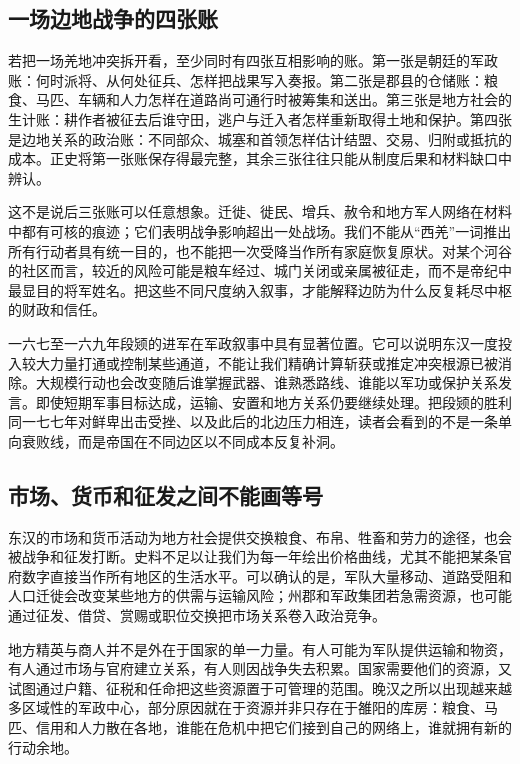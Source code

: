 \subsection{一场边地战争的四张账}

若把一场羌地冲突拆开看，至少同时有四张互相影响的账。第一张是朝廷的军政账：何时派将、从何处征兵、怎样把战果写入奏报。第二张是郡县的仓储账：粮食、马匹、车辆和人力怎样在道路尚可通行时被筹集和送出。第三张是地方社会的生计账：耕作者被征去后谁守田，逃户与迁入者怎样重新取得土地和保护。第四张是边地关系的政治账：不同部众、城塞和首领怎样估计结盟、交易、归附或抵抗的成本。正史将第一张账保存得最完整，其余三张往往只能从制度后果和材料缺口中辨认。

这不是说后三张账可以任意想象。迁徙、徙民、增兵、赦令和地方军人网络在材料中都有可核的痕迹；它们表明战争影响超出一处战场。我们不能从“西羌”一词推出所有行动者具有统一目的，也不能把一次受降当作所有家庭恢复原状。对某个河谷的社区而言，较近的风险可能是粮车经过、城门关闭或亲属被征走，而不是帝纪中最显目的将军姓名。把这些不同尺度纳入叙事，才能解释边防为什么反复耗尽中枢的财政和信任。

一六七至一六九年段颎的进军在军政叙事中具有显著位置。它可以说明东汉一度投入较大力量打通或控制某些通道，不能让我们精确计算斩获或推定冲突根源已被消除。大规模行动也会改变随后谁掌握武器、谁熟悉路线、谁能以军功或保护关系发言。即使短期军事目标达成，运输、安置和地方关系仍要继续处理。把段颎的胜利同一七七年对鲜卑出击受挫、以及此后的北边压力相连，读者会看到的不是一条单向衰败线，而是帝国在不同边区以不同成本反复补洞。

\subsection{市场、货币和征发之间不能画等号}

东汉的市场和货币活动为地方社会提供交换粮食、布帛、牲畜和劳力的途径，也会被战争和征发打断。史料不足以让我们为每一年绘出价格曲线，尤其不能把某条官府数字直接当作所有地区的生活水平。可以确认的是，军队大量移动、道路受阻和人口迁徙会改变某些地方的供需与运输风险；州郡和军政集团若急需资源，也可能通过征发、借贷、赏赐或职位交换把市场关系卷入政治竞争。

地方精英与商人并不是外在于国家的单一力量。有人可能为军队提供运输和物资，有人通过市场与官府建立关系，有人则因战争失去积累。国家需要他们的资源，又试图通过户籍、征税和任命把这些资源置于可管理的范围。晚汉之所以出现越来越多区域性的军政中心，部分原因就在于资源并非只存在于雒阳的库房：粮食、马匹、信用和人力散在各地，谁能在危机中把它们接到自己的网络上，谁就拥有新的行动余地。


